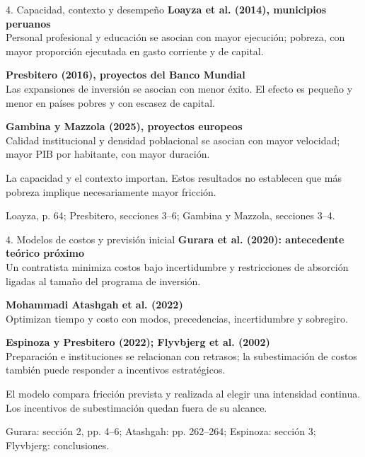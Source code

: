 \documentclass[11pt,aspectratio=169]{beamer}
\newcommand{\notefoot}[1]{\vfill{\scriptsize\color{navy!75}#1}}
\newcommand{\lead}[1]{\begin{block}{}#1\end{block}}
\begin{document}
\begin{frame}{4. Capacidad, contexto y desempeño}
\textbf{Loayza et al. (2014), municipios peruanos}\\[1mm]
Personal profesional y educación se asocian con mayor ejecución; pobreza, con mayor proporción ejecutada en gasto corriente y de capital.
\par\vspace{3mm}
\textbf{Presbitero (2016), proyectos del Banco Mundial}\\[1mm]
Las expansiones de inversión se asocian con menor éxito. El efecto es pequeño y menor en países pobres y con escasez de capital.
\par\vspace{2mm}
\textbf{Gambina y Mazzola (2025), proyectos europeos}\\[1mm]
Calidad institucional y densidad poblacional se asocian con mayor velocidad; mayor PIB por habitante, con mayor duración.
\lead{La capacidad y el contexto importan. Estos resultados no establecen que más pobreza implique necesariamente mayor fricción.}
\notefoot{Loayza, p. 64; Presbitero, secciones 3--6; Gambina y Mazzola, secciones 3--4.}
\end{frame}

\begin{frame}{4. Modelos de costos y previsión inicial}
\textbf{Gurara et al. (2020): antecedente teórico próximo}\\[1mm]
Un contratista minimiza costos bajo incertidumbre y restricciones de absorción ligadas al tamaño del programa de inversión.
\par\vspace{3mm}
\textbf{Mohammadi Atashgah et al. (2022)}\\[1mm]
Optimizan tiempo y costo con modos, precedencias, incertidumbre y sobregiro.
\par\vspace{3mm}
\textbf{Espinoza y Presbitero (2022); Flyvbjerg et al. (2002)}\\[1mm]
Preparación e instituciones se relacionan con retrasos; la subestimación de costos también puede responder a incentivos estratégicos.
\lead{El modelo compara fricción prevista y realizada al elegir una intensidad continua. Los incentivos de subestimación quedan fuera de su alcance.}
\notefoot{Gurara: sección 2, pp. 4--6; Atashgah: pp. 262--264; Espinoza: sección 3; Flyvbjerg: conclusiones.}
\end{frame}
\end{document}
